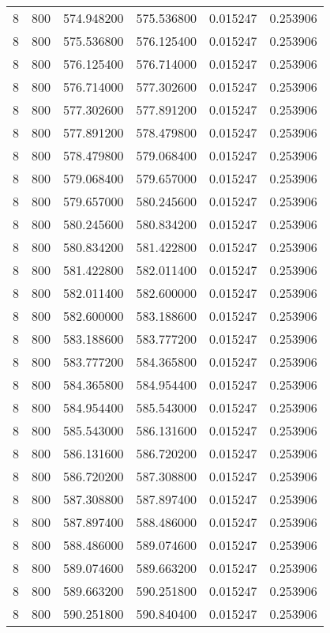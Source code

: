 \begin{longtable}{rrrrrr}
8 & 800 & 574.948200 & 575.536800 & 0.015247 & 0.253906 \\
8 & 800 & 575.536800 & 576.125400 & 0.015247 & 0.253906 \\
8 & 800 & 576.125400 & 576.714000 & 0.015247 & 0.253906 \\
8 & 800 & 576.714000 & 577.302600 & 0.015247 & 0.253906 \\
8 & 800 & 577.302600 & 577.891200 & 0.015247 & 0.253906 \\
8 & 800 & 577.891200 & 578.479800 & 0.015247 & 0.253906 \\
8 & 800 & 578.479800 & 579.068400 & 0.015247 & 0.253906 \\
8 & 800 & 579.068400 & 579.657000 & 0.015247 & 0.253906 \\
8 & 800 & 579.657000 & 580.245600 & 0.015247 & 0.253906 \\
8 & 800 & 580.245600 & 580.834200 & 0.015247 & 0.253906 \\
8 & 800 & 580.834200 & 581.422800 & 0.015247 & 0.253906 \\
8 & 800 & 581.422800 & 582.011400 & 0.015247 & 0.253906 \\
8 & 800 & 582.011400 & 582.600000 & 0.015247 & 0.253906 \\
8 & 800 & 582.600000 & 583.188600 & 0.015247 & 0.253906 \\
8 & 800 & 583.188600 & 583.777200 & 0.015247 & 0.253906 \\
8 & 800 & 583.777200 & 584.365800 & 0.015247 & 0.253906 \\
8 & 800 & 584.365800 & 584.954400 & 0.015247 & 0.253906 \\
8 & 800 & 584.954400 & 585.543000 & 0.015247 & 0.253906 \\
8 & 800 & 585.543000 & 586.131600 & 0.015247 & 0.253906 \\
8 & 800 & 586.131600 & 586.720200 & 0.015247 & 0.253906 \\
8 & 800 & 586.720200 & 587.308800 & 0.015247 & 0.253906 \\
8 & 800 & 587.308800 & 587.897400 & 0.015247 & 0.253906 \\
8 & 800 & 587.897400 & 588.486000 & 0.015247 & 0.253906 \\
8 & 800 & 588.486000 & 589.074600 & 0.015247 & 0.253906 \\
8 & 800 & 589.074600 & 589.663200 & 0.015247 & 0.253906 \\
8 & 800 & 589.663200 & 590.251800 & 0.015247 & 0.253906 \\
8 & 800 & 590.251800 & 590.840400 & 0.015247 & 0.253906 \\

\end{longtable}
